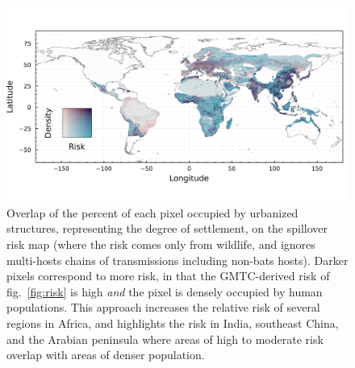 \documentclass[11pt]{article}
\makeatletter
\def\maxwidth{\ifdim\Gin@nat@width>\linewidth\linewidth
\else\Gin@nat@width\fi}
\let\Oldincludegraphics\includegraphics
\renewcommand{\includegraphics}[1]{\Oldincludegraphics[width=\maxwidth]{#1}}
\makeatother
\begin{document}
\begin{figure}
\hypertarget{fig:compound}{%
\centering
\includegraphics{figures/risk_compounded.png}
\caption{Overlap of the percent of each pixel occupied by urbanized
structures, representing the degree of settlement, on the spillover risk
map (where the risk comes only from wildlife, and ignores multi-hosts
chains of transmissions including non-bats hosts). Darker pixels
correspond to more risk, in that the GMTC-derived risk of
fig.~\ref{fig:risk} is high \emph{and} the pixel is densely occupied by
human populations. This approach increases the relative risk of several
regions in Africa, and highlights the risk in India, southeast China,
and the Arabian peninsula where areas of high to moderate risk overlap
with areas of denser population.}\label{fig:compound}
}
\end{figure}
\end{document}
